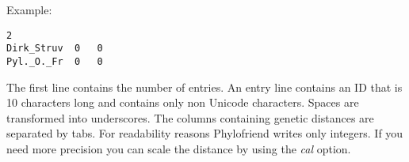 Example:

\begin{verbatim}
2
Dirk_Struv	0	0
Pyl._O._Fr	0	0
\end{verbatim}

The first line contains the number of entries. An entry
line contains an ID that is 10 characters long and contains
only non Unicode characters. Spaces are transformed into
underscores. The columns containing genetic distances
are separated by tabs. For readability reasons
Phylofriend writes only integers. If you need more precision
you can scale the distance by using the \emph{cal} option.








